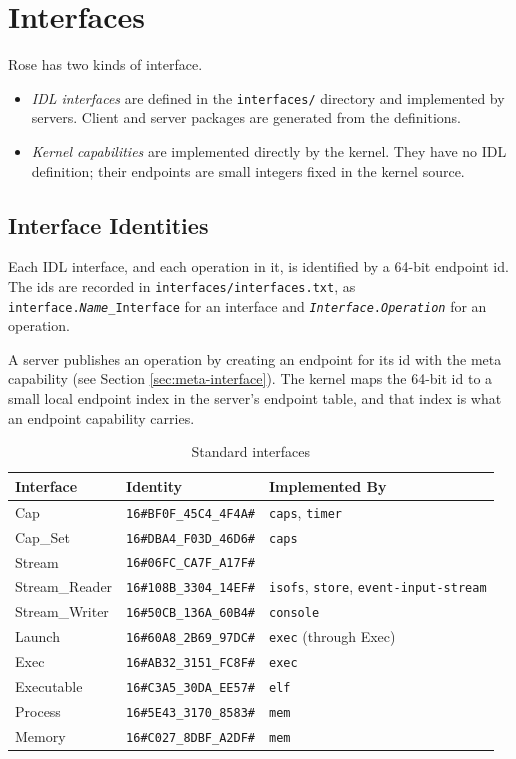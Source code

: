 \chapter{Interfaces}

Rose has two kinds of interface.

\begin{itemize}
    \item {\em IDL interfaces} are defined in the {\tt interfaces/} directory and implemented by servers.  Client and server packages are generated from the definitions.
    \item {\em Kernel capabilities} are implemented directly by the kernel.  They have no IDL definition; their endpoints are small integers fixed in the kernel source.
\end{itemize}

\section{Interface Identities}

Each IDL interface, and each operation in it, is identified by a 64-bit endpoint id.  The ids are recorded in {\tt interfaces/interfaces.txt}, as {\tt interface.{\em Name}\_Interface} for an interface and {\tt {\em Interface}.{\em Operation}} for an operation.

A server publishes an operation by creating an endpoint for its id with the meta capability (see Section \ref{sec:meta-interface}).  The kernel maps the 64-bit id to a small local endpoint index in the server's endpoint table, and that index is what an endpoint capability carries.

\begin{table}[ht]
\begin{tabular}{l l l}
\hline\hline
Interface & Identity & Implemented By \\ [0.5ex]
\hline
Cap             & {\tt 16\#BF0F\_45C4\_4F4A\#} & {\tt caps}, {\tt timer} \\
Cap\_Set        & {\tt 16\#DBA4\_F03D\_46D6\#} & {\tt caps} \\
Stream          & {\tt 16\#06FC\_CA7F\_A17F\#} & \\
Stream\_Reader  & {\tt 16\#108B\_3304\_14EF\#} & {\tt isofs}, {\tt store}, {\tt event-input-stream} \\
Stream\_Writer  & {\tt 16\#50CB\_136A\_60B4\#} & {\tt console} \\
Launch          & {\tt 16\#60A8\_2B69\_97DC\#} & {\tt exec} (through Exec) \\
Exec            & {\tt 16\#AB32\_3151\_FC8F\#} & {\tt exec} \\
Executable      & {\tt 16\#C3A5\_30DA\_EE57\#} & {\tt elf} \\
Process         & {\tt 16\#5E43\_3170\_8583\#} & {\tt mem} \\
Memory          & {\tt 16\#C027\_8DBF\_A2DF\#} & {\tt mem} \\
\hline
\end{tabular}
\caption{Standard interfaces}
\label{table:system_interfaces}
\end{table}

